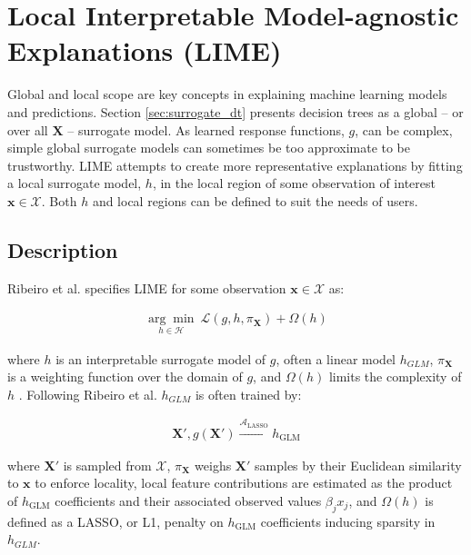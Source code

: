 \documentclass[sigconf, review]{acmart}
\begin{document}
\section{Local Interpretable Model-agnostic Explanations (LIME)}
\label{sec:lime}

Global and local scope are key concepts in explaining machine learning models and predictions. Section \ref{sec:surrogate_dt} presents decision trees as a global -- or over all $\mathbf{X}$ -- surrogate model. As learned response functions, $g$, can be complex, simple global surrogate models can sometimes be too approximate to be trustworthy. LIME attempts to create more representative explanations by fitting a local surrogate model, $h$, in the local region of some observation of interest $\mathbf{x} \in \mathcal{X}$. Both $h$ and local regions can be defined to suit the needs of users.

\subsection{Description}

Ribeiro et al. specifies LIME for some observation $\mathbf{x} \in \mathcal{X}$ as:

\begin{equation}
\begin{aligned}
\underset{h \in \mathcal{H}}{\arg\min}\:\mathcal{L}(g, h, \pi_{\mathbf{X}}) + \Omega(h)
\end{aligned}
\end{equation}

\noindent where $h$ is an interpretable surrogate model of $g$, often a linear model $h_{GLM}$, $\pi_{\mathbf{X}}$ is a weighting function over the domain of $g$, and $\Omega(h)$ limits the complexity of $h$ \cite{lime}. Following Ribeiro et al. $h_{GLM}$ is often trained by:

\begin{equation}
\begin{aligned}
\mathbf{X}', g(\mathbf{X}') \xrightarrow{\mathcal{A}_{\text{LASSO}}} h_{\text{GLM}}
\end{aligned}
\end{equation}

\noindent where $\mathbf{X}'$ is sampled from $\mathcal{X}$, $\pi_{\mathbf{X}}$ weighs $\mathbf{X}'$ samples by their Euclidean similarity to $\mathbf{x}$ to enforce locality, local feature contributions are estimated as the product of $h_{\text{GLM}}$ coefficients and their associated observed values $\beta_j x_j$, and $\Omega(h)$ is defined as a LASSO, or L1, penalty on $h_{\text{GLM}}$ coefficients inducing sparsity in $h_{GLM}$. 		
\end{document}
